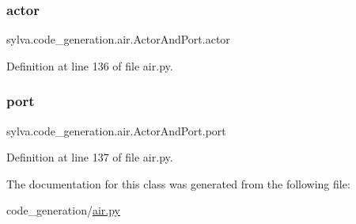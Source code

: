 \subsubsection{\texorpdfstring{actor}{actor}}
{\footnotesize\ttfamily sylva.\+code\+\_\+generation.\+air.\+Actor\+And\+Port.\+actor}



Definition at line 136 of file air.\+py.

\mbox{\label{classsylva_1_1code__generation_1_1air_1_1_actor_and_port_a2401a1fc2b007251a2ed4918b484d687}} 
\subsubsection{\texorpdfstring{port}{port}}
{\footnotesize\ttfamily sylva.\+code\+\_\+generation.\+air.\+Actor\+And\+Port.\+port}



Definition at line 137 of file air.\+py.



The documentation for this class was generated from the following file\+:\begin{DoxyCompactItemize}
\item 
code\+\_\+generation/\hyperlink{air_8py}{air.\+py}\end{DoxyCompactItemize}
